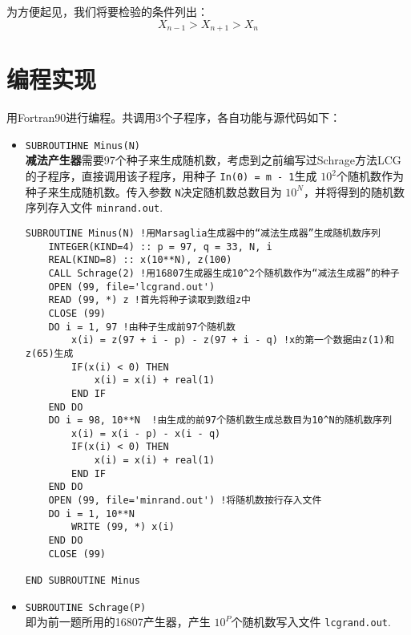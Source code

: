 \documentclass[qpt,a4paper,utf8]{ctexart}
\begin{document}
为方便起见，我们将要检验的条件列出：
\begin{equation}
X_{n-1}>X_{n+1}>X_n 
\end{equation}

\section{编程实现}

用Fortran90进行编程。共调用3个子程序，各自功能与源代码如下：

\begin{itemize}
    \item \texttt{SUBROUTIHNE Minus(N)}\\
\textbf{减法产生器}需要97个种子来生成随机数，考虑到之前编写过Schrage方法LCG的子程序，直接调用该子程序，用种子
\texttt{In(0) = m - 1}生成
$10^2$个随机数作为种子来生成随机数。传入参数 \texttt{N}决定随机数总数目为
$10^N$，并将得到的随机数序列存入文件 \texttt{minrand.out}.

\begin{framed}
\begin{lstlisting}[frame=trBL]
SUBROUTINE Minus(N) !用Marsaglia生成器中的“减法生成器”生成随机数序列
    INTEGER(KIND=4) :: p = 97, q = 33, N, i
    REAL(KIND=8) :: x(10**N), z(100) 
    CALL Schrage(2) !用16807生成器生成10^2个随机数作为“减法生成器”的种子
    OPEN (99, file='lcgrand.out')
    READ (99, *) z !首先将种子读取到数组z中
    CLOSE (99)
    DO i = 1, 97 !由种子生成前97个随机数
        x(i) = z(97 + i - p) - z(97 + i - q) !x的第一个数据由z(1)和z(65)生成
        IF(x(i) < 0) THEN
            x(i) = x(i) + real(1)
        END IF
    END DO
    DO i = 98, 10**N  !由生成的前97个随机数生成总数目为10^N的随机数序列
        x(i) = x(i - p) - x(i - q)
        IF(x(i) < 0) THEN
            x(i) = x(i) + real(1)
        END IF
    END DO
    OPEN (99, file='minrand.out') !将随机数按行存入文件
    DO i = 1, 10**N
        WRITE (99, *) x(i)
    END DO
    CLOSE (99)

END SUBROUTINE Minus
\end{lstlisting}
\end{framed}

\item \texttt{SUBROUTINE Schrage(P)}\\
即为前一题所用的16807产生器，产生 $10^P$个随机数写入文件 \texttt{lcgrand.out}.


\end{itemize}
\end{document}
